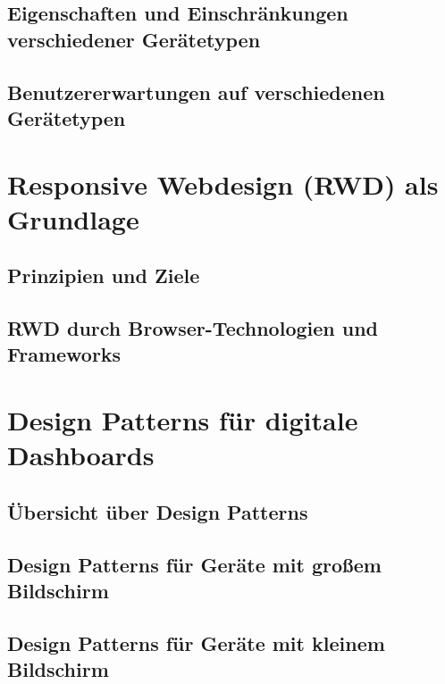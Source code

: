 \documentclass[conference,compsoc,final,a4paper]{IEEEtran}
\begin{document}
    \subsection{Eigenschaften und Einschränkungen verschiedener Gerätetypen}

    \subsection{Benutzererwartungen auf verschiedenen Gerätetypen}




    \section{Responsive Webdesign (RWD) als Grundlage}

    \subsection{Prinzipien und Ziele}

    \subsection{RWD durch Browser-Technologien und Frameworks}




    \section{Design Patterns für digitale Dashboards}

    \subsection{Übersicht über Design Patterns}

    \subsection{Design Patterns für Geräte mit großem Bildschirm}

    \subsection{Design Patterns für Geräte mit kleinem Bildschirm}
\end{document}
